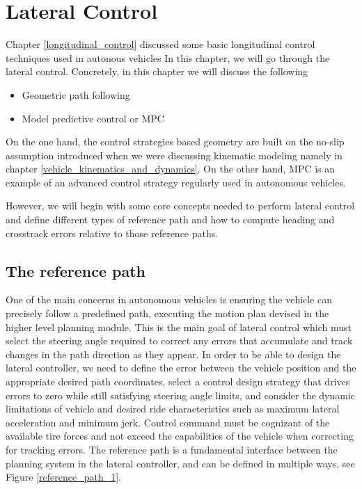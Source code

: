 \section{Lateral Control}
\label{lateral_control}

Chapter \ref{longitudinal_control} discussed  some basic longitudinal control techniques used in autonous vehicles
In this chapter, we will go through the lateral control. Concretely, in this chapter we will discuss the following

\begin{itemize}
\item Geometric path following
\item Model predictive control or MPC
\end{itemize}

On the one hand, the control strategies based geometry are built on the no-slip assumption introduced when we were discussing kinematic modeling namely in chapter \ref{vehicle_kinematics_and_dynamics}.
On the other hand, MPC is an example of an advanced control strategy regularly used in autonomous vehicles.

However, we will begin with some core concepts needed to perform lateral control and define different types of
reference path and how to compute heading and crosstrack errors relative to those reference paths.  

\subsection{The reference path}

One of the main concerns in autonomous vehicles is ensuring the vehicle can precisely
follow a predefined path, executing the motion plan devised in the higher level
planning module. This is the main goal of lateral control which must select
the steering angle required to correct any errors that accumulate and track changes in the path
direction as they appear. In order to be able to design the lateral controller, we need to define the error between the vehicle position and the
appropriate desired path coordinates, select a control design strategy that drives errors to zero while still satisfying
steering angle limits, and consider the dynamic limitations of vehicle and desired ride characteristics such as maximum lateral acceleration and minimum jerk. 
Control command must be cognizant of the available tire forces and not exceed the capabilities of the vehicle when correcting
for tracking errors. The reference path is a fundamental interface between the planning system in the lateral controller, and can be defined in multiple ways, see Figure \ref{reference_path_1}. 


